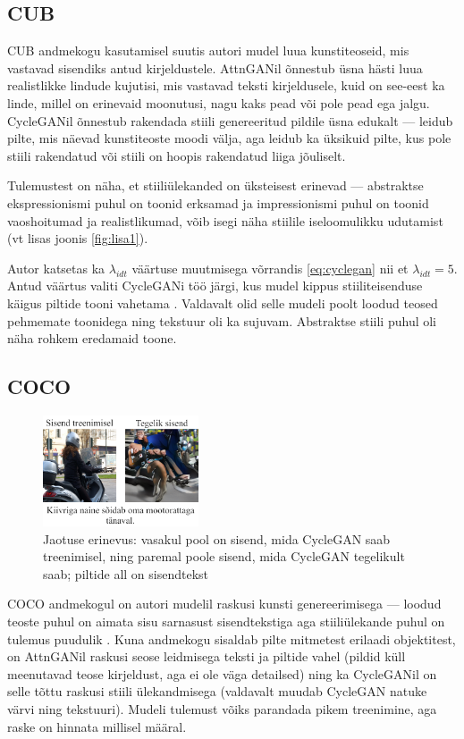\documentclass{vilgym}
\begin{document}
	\subsection{CUB}
	CUB andmekogu kasutamisel suutis autori mudel luua kunstiteoseid, mis vastavad sisendiks antud kirjeldustele. AttnGANil õnnestub üsna hästi luua realistlikke lindude kujutisi, mis vastavad teksti kirjeldusele, kuid on see-eest ka linde, millel on erinevaid moonutusi, nagu kaks pead või pole pead ega jalgu. CycleGANil õnnestub rakendada stiili genereeritud pildile üsna edukalt  --- leidub pilte, mis näevad kunstiteoste moodi välja, aga leidub ka üksikuid pilte, kus pole stiili rakendatud või stiili on hoopis rakendatud liiga jõuliselt.

	Tulemustest on näha, et stiiliülekanded on üksteisest erinevad --- abstraktse ekspressionismi puhul on toonid erksamad ja impressionismi puhul on toonid vaoshoitumad ja realistlikumad, võib isegi näha stiilile iseloomulikku udutamist (vt lisas joonis \ref{fig:lisa1}).

	Autor katsetas ka $ \lambda_{idt} $ väärtuse muutmisega võrrandis \ref{eq:cyclegan} nii et $ \lambda_{idt} = 5 $. Antud väärtus valiti CycleGANi töö järgi, kus mudel kippus stiiliteisenduse käigus piltide tooni vahetama \parencite{cyclegan}. Valdavalt olid selle mudeli poolt loodud teosed pehmemate toonidega ning tekstuur oli ka sujuvam. Abstraktse stiili puhul oli näha rohkem eredamaid toone.

	\subsection{COCO}

	\begin{figure}
		\includegraphics[width=0.41\textwidth]{images/distribution.png}
		\caption{Jaotuse erinevus: vasakul pool on sisend, mida CycleGAN saab treenimisel, ning paremal poole sisend, mida CycleGAN tegelikult saab; piltide all on sisendtekst}
		\label{fig:dist}
	\end{figure}
	COCO andmekogul on autori mudelil raskusi kunsti genereerimisega --- loodud teoste puhul on aimata sisu sarnasust sisendtekstiga aga stiiliülekande puhul on tulemus puudulik . Kuna andmekogu sisaldab pilte mitmetest erilaadi objektitest, on AttnGANil raskusi seose leidmisega teksti ja piltide vahel (pildid küll meenutavad teose kirjeldust, aga ei ole väga detailsed) ning ka CycleGANil on selle tõttu raskusi stiili ülekandmisega (valdavalt muudab CycleGAN natuke värvi ning tekstuuri). Mudeli tulemust võiks parandada pikem treenimine, aga raske on hinnata millisel määral.
\end{document}
